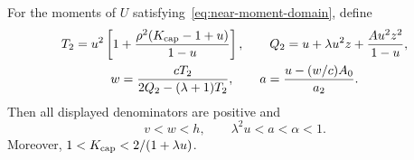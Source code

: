 \begin{lemma}\label{lem:near-prefix}
For the moments of $U$ satisfying~\eqref{eq:near-moment-domain}, define
\begin{equation}\label{eq:near-assigned-pair}
 \begin{gathered}
 T_2=u^2\left[1+\frac{\rho^2(K_{\rm cap}-1+u)}{1-u}\right],\qquad
 Q_2=u+\lambda u^2z+\frac{Au^2z^2}{1-u},\\
 w=\frac{cT_2}{2Q_2-(\lambda+1)T_2},\qquad
 a=\frac{u-(w/c)A_0}{a_2}.
 \end{gathered}
\end{equation}
Then all displayed denominators are positive and
\begin{equation}\label{eq:near-assigned-range}
 v<w<h,\qquad \lambda^2u<a<\alpha<1.
\end{equation}
Moreover, $1<K_{\rm cap}<2/(1+\lambda u)$.
\end{lemma}

